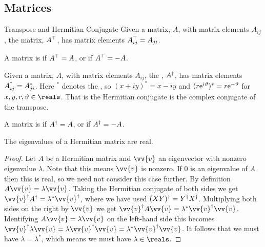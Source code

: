 \subsection{Matrices}
\begin{dfn}{Transpose and Hermitian Conjugate}{}
    Given a matrix, \(A\), with matrix elements \(A_{ij}\), the  matrix, \(A^\top\), has matrix elements \(A^\top_{ij} = A_{ji}\).
    
    A matrix is  if \(A^\top = A\), or  if \(A^\top = -A\).
    
    Given a matrix, \(A\), with matrix elements \(A_{ij}\), the , \(A^\dagger\), has matrix elements \(A^\dagger_{ij} = A_{ji}^*\).
    Here \(^*\) denotes the , so \((x + iy)^* = x - iy\) and \((r\mathrm{e}^{i\vartheta})^* = r\mathrm{e}^{-\vartheta}\) for \(x, y, r, \vartheta \in \reals\).
    That is the Hermitian conjugate is the complex conjugate of the transpose.
    
    A matrix is  if \(A^\dagger = A\), or  if \(A^\dagger = -A\).
\end{dfn}

\begin{lma}{}{}
    The eigenvalues of a Hermitian matrix are real.
    \begin{proof}
        Let \(A\) be a Hermitian matrix and \(\vv{v}\) an eigenvector with nonzero eigenvalue \(\lambda\).
        Note that this means \(\vv{v}\) is nonzero.
        If \(0\) is an eigenvalue of \(A\) then this is real, so we need not consider this case further.
        By definition \(A\vv{v} = \lambda\vv{v}\).
        Taking the Hermitian conjugate of both sides we get \(\vv{v}^\hermit A^\hermit = \lambda^*\vv{v}^\hermit\), where we have used \((XY)^\dagger = Y^\dagger X^\dagger\).
        Multiplying both sides on the right by \(\vv{v}\) we get \(\vv{v}^\hermit A \vv{v} = \lambda^*\vv{v}^\hermit \vv{v}\).
        Identifying \(A\vv{v} = \lambda\vv{v}\) on the left-hand side this becomes \(\vv{v}^\hermit \lambda \vv{v} = \lambda\vv{v}^\hermit \vv{v} = \lambda^*\vv{v}^\hermit \vv{v}\).
        It follows that we must have \(\lambda = \lambda^*\), which means we must have \(\lambda \in \reals\).
    \end{proof}
\end{lma}

